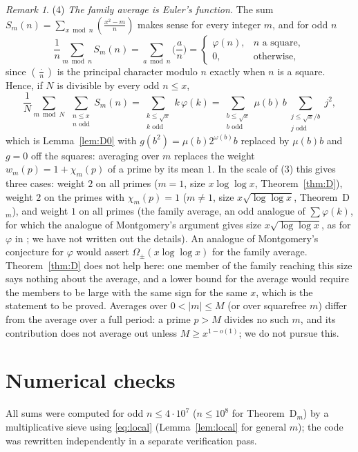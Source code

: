 \documentclass[11pt]{amsart}
\theoremstyle{remark}
\newtheorem{remark}{Remark}
\begin{document}
\begin{remark}
(4) \emph{The family average is Euler's function.} The sum $S_m(n)=\sum_{x\bmod n}(\frac{x^2-m}n)$ makes sense for every integer $m$, and for odd $n$
\[
\frac1n\sum_{m\bmod n}S_m(n)=\sum_{a\bmod n}\Big(\frac an\Big)=\begin{cases}\varphi(n),& n\text{ a square},\\0,&\text{otherwise},\end{cases}
\]
since $(\frac\cdot n)$ is the principal character modulo $n$ exactly when $n$ is a square. Hence, if $N$ is divisible by every odd $n\le x$,
\[
\frac1N\sum_{m\bmod N}\ \sum_{\substack{n\le x\\ n\text{ odd}}}S_m(n)=\sum_{\substack{k\le\sqrt x\\ k\text{ odd}}}k\,\varphi(k)=\sum_{\substack{b\le\sqrt x\\ b\text{ odd}}}\mu(b)\,b\sum_{\substack{j\le\sqrt x/b\\ j\text{ odd}}}j^2 ,
\]
which is Lemma~\ref{lem:D0} with $g(b^2)=\mu(b)2^{\omega(b)}b$ replaced by $\mu(b)b$ and $g=0$ off the squares: averaging over $m$ replaces the weight $w_m(p)=1+\chi_m(p)$ of a prime by its mean $1$. In the scale of (3) this gives three cases: weight $2$ on all primes ($m=1$, size $x\log\log x$, Theorem~\ref{thm:D}), weight $2$ on the primes with $\chi_m(p)=1$ ($m\neq1$, size $x\sqrt{\log\log x}$, Theorem~D$_m$), and weight $1$ on all primes (the family average, an odd analogue of $\sum\varphi(k)$, for which the analogue of Montgomery's argument gives size $x\sqrt{\log\log x}$, as for $\varphi$ in \cite{Mo}; we have not written out the details). An analogue of Montgomery's conjecture for $\varphi$ would assert $\Omega_\pm(x\log\log x)$ for the family average. Theorem~\ref{thm:D} does not help here: one member of the family reaching this size says nothing about the average, and a lower bound for the average would require the members to be large with the same sign for the same $x$, which is the statement to be proved. Averages over $0<|m|\le M$ (or over squarefree $m$) differ from the average over a full period: a prime $p>M$ divides no such $m$, and its contribution does not average out unless $M\ge x^{1-o(1)}$; we do not pursue this.
\end{remark}

\section{Numerical checks}\label{sec:num}

All sums were computed for odd $n\le4\cdot10^7$ ($n\le10^8$ for Theorem~D$_m$) by a multiplicative sieve using \eqref{eq:local} (Lemma~\ref{lem:local} for general $m$); the code was rewritten independently in a separate verification pass.
\end{document}

